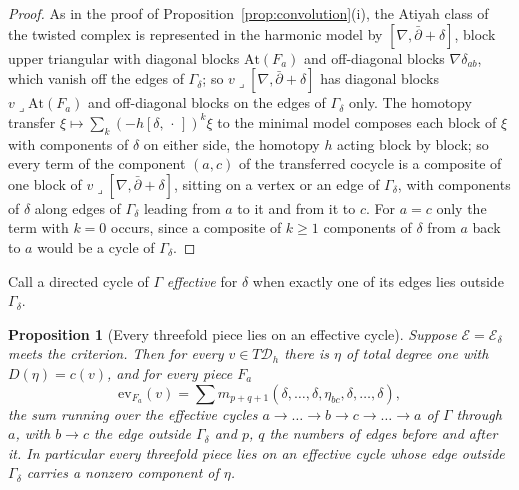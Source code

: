 \documentclass[11pt,reqno]{amsart}
\numberwithin{equation}{section}
\theoremstyle{plain}
\newtheorem{proposition}[theorem]{Proposition}
\theoremstyle{definition}
\newcommand{\cD}{\mathcal{D}}
\begin{document}
\begin{proof}
As in the proof of Proposition~\ref{prop:convolution}(i), the Atiyah class of the twisted complex is represented in the harmonic model by $[\nabla,\bar\partial+\delta]$, block upper triangular with diagonal blocks $\mathrm{At}(F_{a})$ and off-diagonal blocks $\nabla\delta_{ab}$, which vanish off the edges of $\Gamma_{\delta}$; so $v\lrcorner[\nabla,\bar\partial+\delta]$ has diagonal blocks $v\lrcorner\mathrm{At}(F_{a})$ and off-diagonal blocks on the edges of $\Gamma_{\delta}$ only. The homotopy transfer $\xi\mapsto\sum_{k}(-h[\delta,\,\cdot\,])^{k}\xi$ to the minimal model composes each block of $\xi$ with components of $\delta$ on either side, the homotopy $h$ acting block by block; so every term of the component $(a,c)$ of the transferred cocycle is a composite of one block of $v\lrcorner[\nabla,\bar\partial+\delta]$, sitting on a vertex or an edge of $\Gamma_{\delta}$, with components of $\delta$ along edges of $\Gamma_{\delta}$ leading from $a$ to it and from it to $c$. For $a=c$ only the term with $k=0$ occurs, since a composite of $k\ge1$ components of $\delta$ from $a$ back to $a$ would be a cycle of $\Gamma_{\delta}$.
\end{proof}

Call a directed cycle of $\Gamma$ \emph{effective} for $\delta$ when exactly one of its edges lies outside $\Gamma_{\delta}$.

\begin{proposition}[Every threefold piece lies on an effective cycle]\label{prop:effective}
Suppose $\mathcal{E}=\mathcal{E}_{\delta}$ meets the criterion. Then for every $v\in T\cD_{h}$ there is $\eta$ of total degree one with $D(\eta)=c(v)$, and for every piece $F_{a}$
\[
\mathrm{ev}_{F_{a}}(v)=\sum m_{p+q+1}(\delta,\dots,\delta,\eta_{bc},\delta,\dots,\delta),
\]
the sum running over the effective cycles $a\to\dots\to b\to c\to\dots\to a$ of $\Gamma$ through $a$, with $b\to c$ the edge outside $\Gamma_{\delta}$ and $p$, $q$ the numbers of edges before and after it. In particular every threefold piece lies on an effective cycle whose edge outside $\Gamma_{\delta}$ carries a nonzero component of $\eta$.
\end{proposition}
\end{document}
